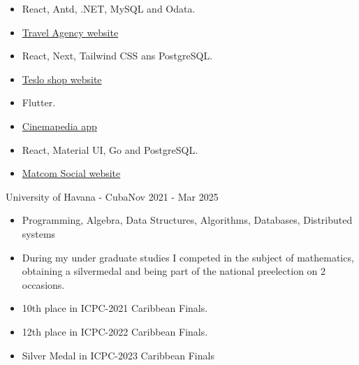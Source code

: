 



\begin{itemize}
	\item React, Antd, .NET, MySQL and Odata.
	\item \href{https://travel-agency-client.onrender.com/}{Travel Agency website}
\end{itemize}

\divider


\begin{itemize}
    \item React, Next, Tailwind CSS ans PostgreSQL.
    \item \href{https://teslo-shop-phi.vercel.app/}{Teslo shop website}
\end{itemize}

\divider


\begin{itemize}
    \item Flutter.
    \item \href{https://github.com/raudel25/cinemapedia_app/releases}{Cinemapedia app}
\end{itemize}

\divider


\begin{itemize}
    \item React, Material UI, Go and PostgreSQL.
    \item \href{https://social-network-client-6f8h.onrender.com/}{Matcom Social website}
\end{itemize}


{University of Havana - Cuba}{Nov 2021 - Mar 2025}{}
\begin{itemize}
    \item Programming, Algebra, Data Structures, Algorithms, Databases, Distributed systems
\end{itemize}


\begin{itemize}
    \item During my under graduate studies I competed in the
          subject of mathematics, obtaining a silvermedal and
          being part of the national preelection on 2 occasions.
    \item 10th place in ICPC-2021 Caribbean Finals.
    \item 12th place in ICPC-2022 Caribbean Finals.
    \item Silver Medal in ICPC-2023 Caribbean Finals

\end{itemize}

